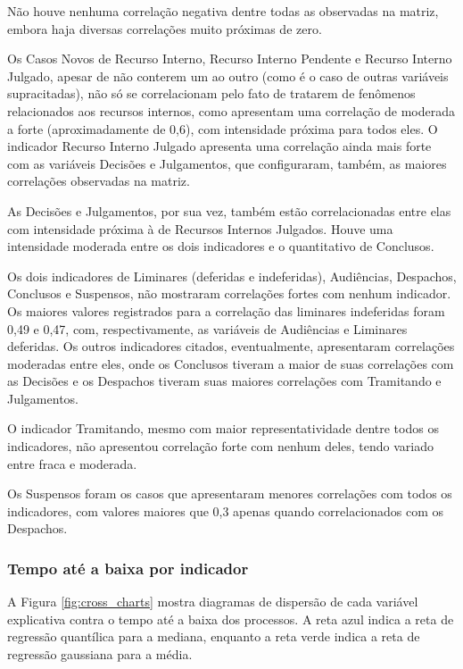 Não houve nenhuma correlação negativa dentre todas as observadas na matriz, embora haja diversas correlações muito próximas de zero.

Os Casos Novos de Recurso Interno, Recurso Interno Pendente e Recurso Interno Julgado, apesar de não conterem um ao outro (como é o caso de outras variáveis supracitadas), não só se correlacionam pelo fato de tratarem de fenômenos relacionados aos recursos internos, como apresentam uma correlação de moderada a forte (aproximadamente de 0,6), com intensidade próxima para todos eles. O indicador Recurso Interno Julgado apresenta uma correlação ainda mais forte com as variáveis Decisões e Julgamentos, que configuraram, também, as maiores correlações observadas na matriz.

As Decisões e Julgamentos, por sua vez, também estão correlacionadas entre elas com intensidade próxima à de Recursos Internos Julgados. Houve uma intensidade moderada entre os dois indicadores e o quantitativo de Conclusos.

Os dois indicadores de Liminares (deferidas e indeferidas), Audiências, Despachos, Conclusos e Suspensos, não mostraram correlações fortes com nenhum indicador. Os maiores valores registrados para a correlação das liminares indeferidas foram 0,49 e 0,47, com, respectivamente, as variáveis de Audiências e Liminares deferidas. Os outros indicadores citados, eventualmente, apresentaram correlações moderadas entre eles, onde os Conclusos tiveram a maior de suas correlações com as Decisões e os Despachos tiveram suas maiores correlações com Tramitando e Julgamentos.

O indicador Tramitando, mesmo com maior representatividade dentre todos os indicadores, não apresentou correlação forte com nenhum deles, tendo variado entre fraca e moderada.

Os Suspensos foram os casos que apresentaram menores correlações com todos os indicadores, com valores maiores que 0,3 apenas quando correlacionados com os Despachos.

\subsubsection{Tempo até a baixa por indicador}

A Figura \ref{fig:cross_charts} mostra diagramas de dispersão de cada variável explicativa contra o tempo até a baixa dos processos. A reta azul indica a reta de regressão quantílica para a mediana, enquanto a reta verde indica a reta de regressão gaussiana para a média.

